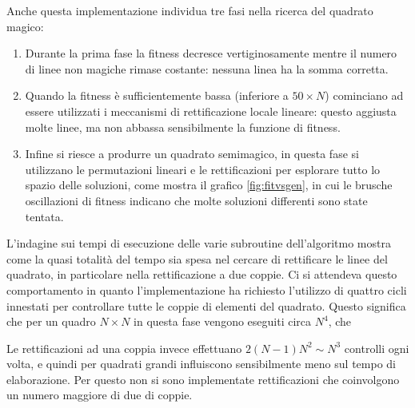 \documentclass[italian,twoside,twocolumn]{article}
\begin{document}
Anche questa implementazione individua tre fasi nella ricerca del quadrato magico:
\begin{enumerate}
	\item Durante la prima fase la fitness decresce vertiginosamente mentre il numero di linee non magiche rimase costante: nessuna linea ha la somma corretta.
	\item Quando la fitness è sufficientemente bassa (inferiore a $ 50 \times N $) cominciano ad essere utilizzati i meccanismi di rettificazione locale lineare: questo aggiusta molte linee, ma non abbassa sensibilmente la funzione di fitness.
	\item Infine si riesce a produrre un quadrato semimagico, in questa fase si utilizzano le permutazioni lineari e le rettificazioni per esplorare tutto lo spazio delle soluzioni, come mostra il grafico \ref{fig:fitvsgen}, in cui le brusche oscillazioni di fitness indicano che molte soluzioni differenti sono state tentata. 
\end{enumerate}


L'indagine sui tempi di esecuzione delle varie subroutine dell'algoritmo mostra come la quasi totalità del tempo sia spesa nel cercare di rettificare le linee del quadrato, in particolare nella rettificazione a due coppie. Ci si attendeva questo comportamento in quanto l'implementazione ha richiesto l'utilizzo di quattro cicli innestati per controllare tutte le coppie di elementi del quadrato. Questo significa che per un quadro $ N\times N $ in questa fase vengono eseguiti circa $ N^4 $, che 

Le rettificazioni ad una coppia invece effettuano $ 2(N-1)N^2 \sim N^3 $ controlli ogni volta, e quindi per quadrati grandi influiscono sensibilmente meno sul tempo di elaborazione. Per questo non si sono implementate rettificazioni che coinvolgono un numero maggiore di due di coppie.
\end{document}
